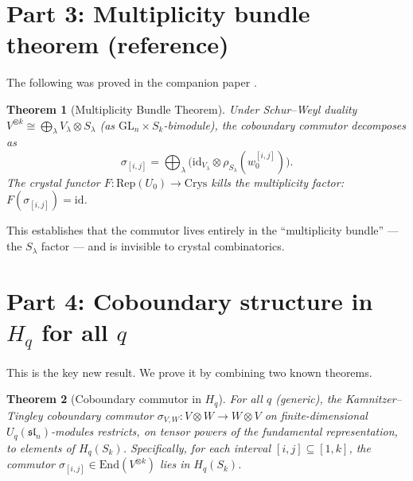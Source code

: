 \documentclass[11pt]{article}
\newtheorem{theorem}{Theorem}
\theoremstyle{remark}
\newcommand{\Rep}{\mathrm{Rep}}
\newcommand{\Crys}{\mathrm{Crys}}
\newcommand{\GL}{\mathrm{GL}}
\newcommand{\End}{\mathrm{End}}
\newcommand{\id}{\mathrm{id}}
\begin{document}
\section{Part 3: Multiplicity bundle theorem (reference)}
\label{sec:part3}

The following was proved in the companion paper \cite{clio-mult-bundle}.

\begin{theorem}[Multiplicity Bundle Theorem]
\label{thm:mult-bundle}
Under Schur--Weyl duality $V^{\otimes k} \cong \bigoplus_\lambda V_\lambda \otimes S_\lambda$
(as $\GL_n \times S_k$-bimodule), the coboundary commutor decomposes as
\[
  \sigma_{[i,j]} = \bigoplus_\lambda \bigl(\id_{V_\lambda} \otimes \rho_{S_\lambda}(w_0^{[i,j]})\bigr).
\]
The crystal functor $F: \Rep(U_0) \to \Crys$ kills the multiplicity factor:
$F(\sigma_{[i,j]}) = \id$.
\end{theorem}

This establishes that the commutor lives entirely in the ``multiplicity bundle''
--- the $S_\lambda$ factor --- and is invisible to crystal combinatorics.

\section{Part 4: Coboundary structure in \texorpdfstring{$H_q$}{Hq} for all \texorpdfstring{$q$}{q}}
\label{sec:part4}

This is the key new result. We prove it by combining two known theorems.

\begin{theorem}[Coboundary commutor in $H_q$]
\label{thm:commutor-in-Hq}
For all $q$ (generic), the Kamnitzer--Tingley coboundary commutor
$\sigma_{V,W}: V \otimes W \to W \otimes V$ on finite-dimensional $U_q(\mathfrak{sl}_n)$-modules
restricts, on tensor powers of the fundamental representation, to elements of $H_q(S_k)$.
Specifically, for each interval $[i,j] \subseteq [1,k]$, the commutor
$\sigma_{[i,j]} \in \End(V^{\otimes k})$ lies in $H_q(S_k)$.
\end{theorem}
\end{document}
